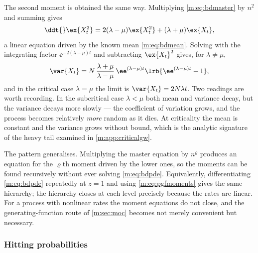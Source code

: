 The second moment is obtained the same way. Multiplying \cref{m:eq:bdmaster} by
$n^2$ and summing gives
\begin{equation}
\label{m:eq:secondmomentode}
\ddt{}\ex{X_t^2} = 2(\lambda-\mu)\ex{X_t^2} + (\lambda+\mu)\ex{X_t},
\end{equation}
a linear equation driven by the known mean \cref{m:eq:bdmean}. Solving with the
integrating factor $\ee^{-2(\lambda-\mu)t}$ and subtracting $\ex{X_t}^2$ gives, for
$\lambda\neq\mu$,
\begin{equation}
\label{m:eq:bdvariance}
\var{X_t} = N\,\frac{\lambda+\mu}{\lambda-\mu}\,
\ee^{(\lambda-\mu)t}\lrb{\ee^{(\lambda-\mu)t}-1},
\end{equation}
and in the critical case $\lambda=\mu$ the limit is $\var{X_t}=2N\lambda t$. Two
readings are worth recording. In the subcritical case $\lambda<\mu$ both mean and
variance decay, but the variance decays more slowly --- the coefficient of
variation grows, and the process becomes relatively \emph{more} random as it dies.
At criticality the mean is constant and the variance grows without bound, which is
the analytic signature of the heavy tail examined in \cref{m:app:criticalgw}.

The pattern generalises. Multiplying the master equation by $n^{\varrho}$ produces
an equation for the $\varrho$th moment driven by the lower ones, so the moments can
be found recursively without ever solving \cref{m:eq:bdpde}. Equivalently,
differentiating \cref{m:eq:bdpde} repeatedly at $z=1$ and using
\cref{m:eq:pgfmoments} gives the same hierarchy; the hierarchy closes at each level
precisely because the rates are linear. For a process with nonlinear rates the
moment equations do not close, and the generating-function route of
\cref{m:sec:moc} becomes not merely convenient but necessary.

\subsubsection{Hitting probabilities}
\label{m:sec:hitting}

